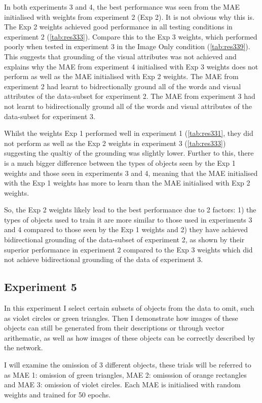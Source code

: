 In both experiments 3 and 4, the best performance was seen from the MAE initialised with weights from experiment 2 (Exp 2). It is not obvious why this is. The Exp 2 weights achieved good performance in all testing conditions in experiment 2 (\autoref{tab:res333}). Compare this to the Exp 3 weights, which performed poorly when tested in experiment 3 in the Image Only condition (\autoref{tab:res339}). This suggests that grounding of the visual attributes was not achieved and explains why the \ac{MAE} from experiment 4 initialised with Exp 3 weights does not perform as well as the \ac{MAE} initialised with Exp 2 weights. The \ac{MAE} from experiment 2 had learnt to bidrectionally ground all of the words and visual attributes of the data-subset for experiment 2. The \ac{MAE} from experiment 3 had not learnt to bidirectionally ground all of the words and visual attributes of the data-subset for experiment 3.

Whilst the weights Exp 1 performed well in experiment 1 (\autoref{tab:res331}, they did not perform as well as the Exp 2 weights in experiment 3 (\autoref{tab:res333}) suggesting the qualtiy of the grounding was slightly lower. Further to this, there is a much bigger difference between the types of objects seen by the Exp 1 weights and those seen in experiments 3 and 4, meaning that the \ac{MAE} initialised with the Exp 1 weights has more to learn than the \ac{MAE} initialised with Exp 2 weights.

So, the Exp 2 weights likely lead to the best performance due to 2 factors: 1) the types of objects used to train it are more similar to those used in experiments 3 and 4 compared to those seen by the Exp 1 weights and 2) they have achieved bidirectional grounding of the data-subset of experiment 2, as shown by their superior performance in experiment 2 compared to the Exp 3 weights which did not achieve bidirectional grounding of the data of experiment 3.


\subsection{Experiment 5}
In this experiment I select certain subsets of objects from the data to omit, such as violet circles or green triangles. Then I demonstrate how images of these objects can still be generated from their descriptions or through vector arithematic, as well as how images of these objects can be correctly described by the network.

I will examine the omission of 3 different objects, these trials will be referred to as MAE 1: omission of green triangles, MAE 2: omisssion of orange rectangles and MAE 3: omission of  violet circles. Each MAE is initialised with random weights and trained for 50 epochs.

